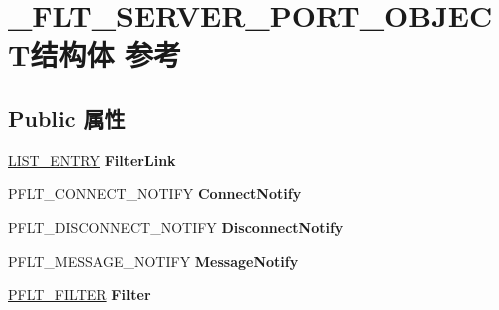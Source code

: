 \hypertarget{struct___f_l_t___s_e_r_v_e_r___p_o_r_t___o_b_j_e_c_t}{}\section{\+\_\+\+F\+L\+T\+\_\+\+S\+E\+R\+V\+E\+R\+\_\+\+P\+O\+R\+T\+\_\+\+O\+B\+J\+E\+C\+T结构体 参考}
\label{struct___f_l_t___s_e_r_v_e_r___p_o_r_t___o_b_j_e_c_t}
\subsection*{Public 属性}
\begin{DoxyCompactItemize}
\item 
\mbox{\label{struct___f_l_t___s_e_r_v_e_r___p_o_r_t___o_b_j_e_c_t_a651dfb052ee12717b5c5780256b073a4}} 
\hyperlink{struct___l_i_s_t___e_n_t_r_y}{L\+I\+S\+T\+\_\+\+E\+N\+T\+RY} {\bfseries Filter\+Link}
\item 
\mbox{\label{struct___f_l_t___s_e_r_v_e_r___p_o_r_t___o_b_j_e_c_t_ae83bd8db204b6febe582f9ad73c2d175}} 
P\+F\+L\+T\+\_\+\+C\+O\+N\+N\+E\+C\+T\+\_\+\+N\+O\+T\+I\+FY {\bfseries Connect\+Notify}
\item 
\mbox{\label{struct___f_l_t___s_e_r_v_e_r___p_o_r_t___o_b_j_e_c_t_a4cd04b03c097936631ef36d92542f2c7}} 
P\+F\+L\+T\+\_\+\+D\+I\+S\+C\+O\+N\+N\+E\+C\+T\+\_\+\+N\+O\+T\+I\+FY {\bfseries Disconnect\+Notify}
\item 
\mbox{\label{struct___f_l_t___s_e_r_v_e_r___p_o_r_t___o_b_j_e_c_t_a68f5b8fed945e359d3cd606686731794}} 
P\+F\+L\+T\+\_\+\+M\+E\+S\+S\+A\+G\+E\+\_\+\+N\+O\+T\+I\+FY {\bfseries Message\+Notify}
\item 
\mbox{\label{struct___f_l_t___s_e_r_v_e_r___p_o_r_t___o_b_j_e_c_t_adaf058b39c4a6072513c79eb75e79925}} 
\hyperlink{struct___f_l_t___f_i_l_t_e_r}{P\+F\+L\+T\+\_\+\+F\+I\+L\+T\+ER} {\bfseries Filter}
\item 
\mbox{\label{struct___f_l_t___s_e_r_v_e_r___p_o_r_t___o_b_j_e_c_t_a4a519105374d880a7bb7676d5973a5fa}} 

\end{DoxyCompactItemize}
